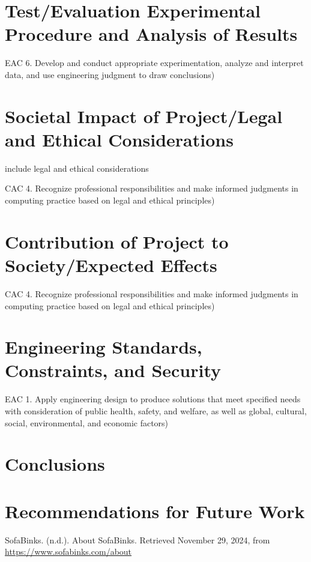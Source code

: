 \documentclass{article}
\begin{document}
\section{Test/Evaluation Experimental Procedure and Analysis of Results} 
EAC 6. Develop and conduct appropriate experimentation, analyze and interpret 
data, and use engineering judgment to draw conclusions) 

\section{Societal Impact of Project\slash Legal and Ethical Considerations} 
include legal and ethical considerations 

CAC 4. Recognize professional responsibilities and make informed judgments in 
computing practice based on legal and ethical principles) 

\section{Contribution of Project to Society\slash Expected Effects}
CAC 4. Recognize professional responsibilities and make informed judgments in 
computing practice based on legal and ethical principles) 

\section{Engineering Standards, Constraints, and Security}
EAC 1. Apply engineering design to produce solutions that meet specified needs with consideration of public health, 
safety, and welfare, as well as global, cultural, social, environmental, and economic 
factors) 
\section{Conclusions}

\section{Recommendations for Future Work}

\begin{thebibliography}{99}
 SofaBinks. (n.d.). 
    About SofaBinks. Retrieved November 29, 2024, from \url{https://www.sofabinks.com/about}
\end{thebibliography}

\end{document}
